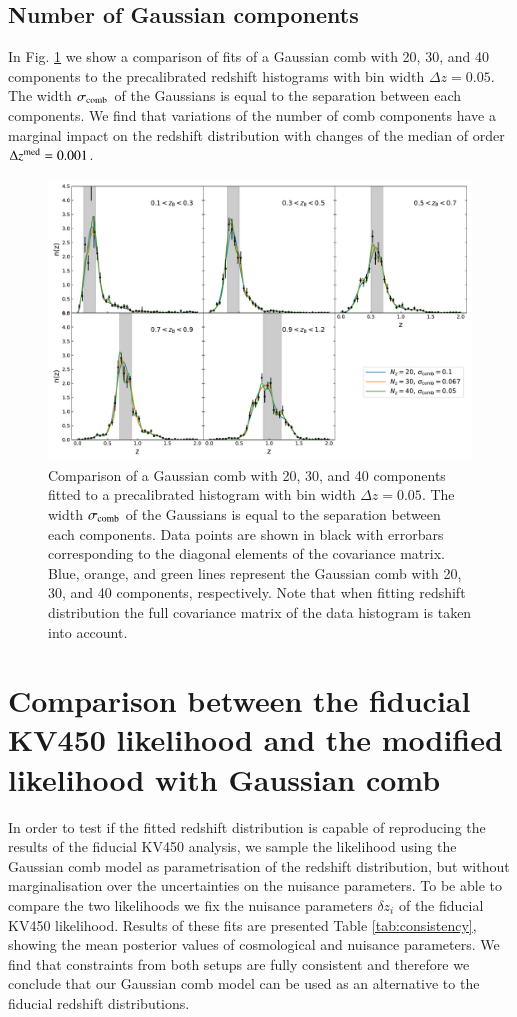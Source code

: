 \documentclass{aa}
\begin{document}
\begin{appendix}
\subsection{Number of Gaussian components}
In Fig. \ref{fig:n_comp} we show a comparison of fits of a Gaussian comb with 20, 30, and 40 components to the precalibrated redshift histograms with bin width $\Delta z = 0.05$.  The width $\sigma_{\rm comb}$ of the Gaussians is equal to the separation between each components. We find that variations of the number of comb components have a marginal impact on the redshift distribution with changes of the median of order $\Delta z^{\rm med} = 0.001$.
\begin{figure}
\centering
\includegraphics[width=\linewidth]{plots/calibration_bin_number.pdf}
\caption{Comparison of a Gaussian comb with 20, 30, and 40 components fitted to a precalibrated histogram with bin width $\Delta z = 0.05$. The width $\sigma_{\rm comb}$ of the Gaussians is equal to the separation between each components. Data points are shown in black with errorbars corresponding to the diagonal elements of the covariance matrix. Blue, orange, and green lines represent the Gaussian comb with 20, 30, and 40 components, respectively. Note that when fitting redshift distribution the full covariance matrix of the data histogram is taken into account.}
\label{fig:n_comp}
\end{figure}
\section{Comparison between the fiducial KV450 likelihood and the modified likelihood with Gaussian comb}
\label{ap:kv450_likelihood}
In order to test if the fitted redshift distribution is capable of reproducing the results of the fiducial KV450 analysis, we sample the likelihood using the Gaussian comb model as parametrisation of the redshift distribution, but without marginalisation over the uncertainties on the nuisance parameters. To be able to compare the two likelihoods we fix the nuisance parameters $\delta z_i$ of the fiducial KV450 likelihood. Results of these fits are presented Table \ref{tab:consistency}, showing the mean posterior values of cosmological and nuisance parameters. We find that constraints from both setups are fully consistent and therefore we conclude that our Gaussian comb model can be used as an alternative to the fiducial redshift distributions.


\end{appendix}
\end{document}
